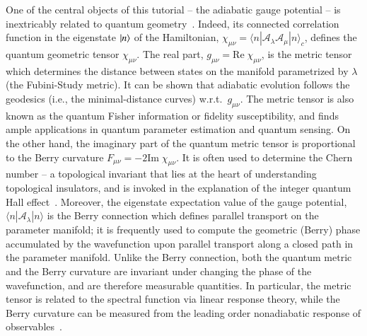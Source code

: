 One of the central objects of this tutorial -- the adiabatic gauge potential -- is inextricably related to quantum geometry~\cite{kolodrubetz2017geometry}. Indeed, its connected correlation function in the eigenstate $\ket{n}$ of the Hamiltonian, $\chi_{\mu\nu}=\langle n|\mathcal{A}_\lambda \mathcal{A}_\mu|n\rangle_c$, defines the quantum geometric tensor $\chi_{\mu\nu}$. 
The real part, $g_{\mu\nu} = \text{Re}\; \chi_{\mu\nu}$, is the metric tensor which determines the distance between states on the manifold parametrized by $\lambda$ (the Fubini-Study metric). It can be shown that adiabatic evolution follows the geodesics (i.e., the minimal-distance curves) w.r.t.~$g_{\mu\nu}$. The metric tensor is also known as the quantum Fisher information or fidelity susceptibility, and finds ample applications in quantum parameter estimation and quantum sensing. 
On the other hand, the imaginary part of the quantum metric tensor is proportional to the Berry curvature $F_{\mu\nu} = -2\text{Im}\; \chi_{\mu\nu}$. It is often used to determine the Chern number -- a topological invariant that lies at the heart of understanding topological insulators, and is invoked in the explanation of the integer quantum Hall effect~\cite{bradlyn2022lecture}. Moreover, the eigenstate expectation value of the gauge potential, $\langle n|\mathcal{A}_\lambda|n\rangle$ is the Berry connection which defines parallel transport on the parameter manifold; it is frequently used to compute the geometric (Berry) phase accumulated by the wavefunction upon parallel transport along a closed path in the parameter manifold. 
Unlike the Berry connection, both the quantum metric and the Berry curvature are invariant under changing the phase of the wavefunction, and are therefore measurable quantities. In particular, the metric tensor is related to the spectral function via linear response theory, while the Berry curvature can be measured from the leading order nonadiabatic response of observables~\cite{kolodrubetz2017geometry}. 

